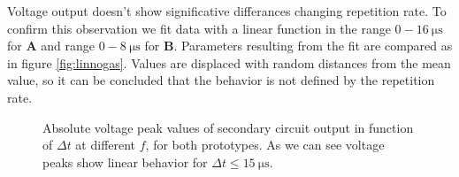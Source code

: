 Voltage output doesn't show significative differances changing repetition rate. To confirm this observation we fit data with a linear function in the range $0-\SI{16}{\micro\second}$ for \textbf{A} and range $0-\SI{8}{\micro\second}$ for \textbf{B}. Parameters resulting from the fit are compared as in figure \ref{fig:linnogas}. Values are displaced with random distances from the mean value, so it can be concluded that the behavior is not defined by the repetition rate.
\begin{figure}
 \centering
 \hfill
 \caption{Absolute voltage peak values of secondary circuit output in function of $\Delta t$ at different $f$, for both prototypes. As we can see voltage peaks show linear behavior for $\Delta t \le \SI{15}{\micro\second}$.}
 \label{fig:nogas}
\end{figure}


